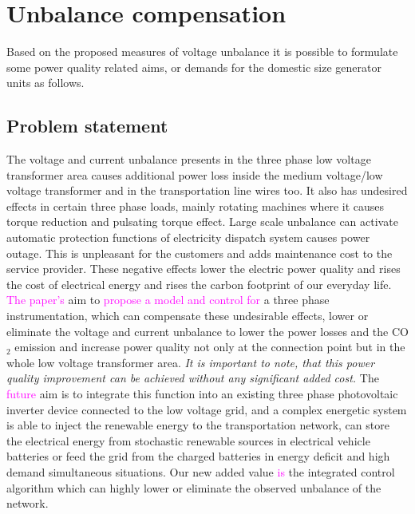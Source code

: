 
\section{Unbalance compensation}
Based on the proposed measures of voltage unbalance it is possible to formulate some power quality related aims, or demands for the domestic size generator units as follows.

    \subsection{Problem statement}

    The voltage and current unbalance presents in the three phase low voltage transformer area causes additional power loss inside the medium voltage/low voltage transformer and in the transportation line wires too. It also has undesired effects in certain three phase loads, mainly rotating machines where it causes torque reduction and pulsating torque effect. Large scale unbalance can activate automatic protection functions of electricity dispatch system causes power outage. This is unpleasant for the customers and adds maintenance cost to the service provider. These negative effects lower the electric power quality and rises the cost of electrical energy and rises the carbon footprint of our everyday life.  \textcolor{magenta}{The paper's} aim to \textcolor{magenta}{propose a model and control for} a three phase instrumentation, which can compensate these undesirable effects, lower or eliminate the voltage and current unbalance to lower the power losses and the CO${}_2$ emission and increase power quality not only at the connection point but in the whole low voltage transformer area. \emph{It is important to note, that this power quality improvement can be achieved without any significant added cost.} The \textcolor{magenta}{future} aim is to integrate this function into an existing three phase photovoltaic inverter device connected to the low voltage grid, and a  complex energetic system is able to inject the renewable energy to the transportation network, can store the electrical energy from stochastic renewable sources in electrical vehicle batteries or feed the grid from the charged batteries in energy deficit and high demand simultaneous situations. Our new added value \textcolor{magenta}{is} the integrated control algorithm which can highly lower or eliminate the observed unbalance of the network.


